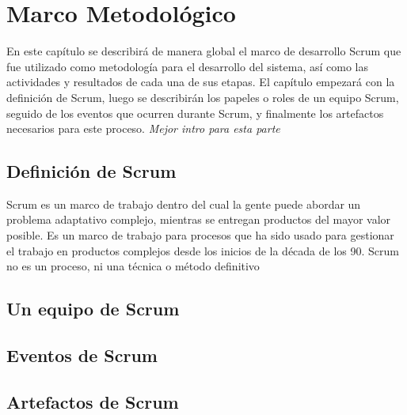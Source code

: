 \chapter{Marco Metodológico}

En este capítulo se describirá de manera global el marco de desarrollo Scrum que fue utilizado como metodología para el desarrollo del sistema, así como las actividades y resultados de cada una de sus etapas. El capítulo empezará con la definición de Scrum, luego se describirán los papeles o roles de un equipo Scrum, seguido de los eventos que ocurren durante Scrum, y finalmente los artefactos necesarios para este proceso. \textit{Mejor intro para esta parte}

\section{Definición de Scrum}
Scrum es un marco de trabajo dentro del cual la gente puede abordar un problema adaptativo complejo, mientras se entregan productos del mayor valor posible. Es un marco de trabajo para procesos que ha sido usado para gestionar el trabajo en productos complejos desde los inicios de la década de los 90. Scrum no es un proceso, ni una técnica o método definitivo

\section{Un equipo de Scrum}

\section{Eventos de Scrum}

\section{Artefactos de Scrum}